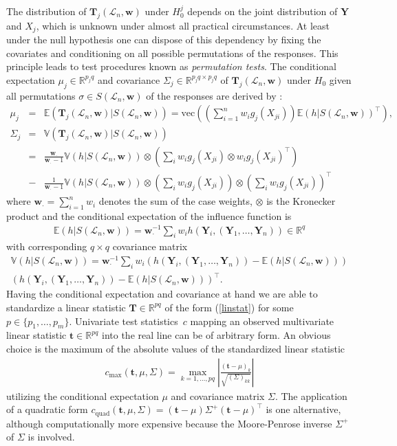\documentclass{Z}
\renewcommand{\E}{\mathbb{E}}
\newcommand{\V}{\mathbb{V}}
\newcommand{\R}{\mathbb{R} }
\newcommand{\LS}{\mathcal{L}_n}
\newcommand{\Y}{\mathbf{Y}}
\newcommand{\T}{\mathbf{T}}
\newcommand{\w}{\mathbf{w}}
\newcommand{\ws}{\mathbf{w}_\cdot}
\renewcommand{\vec}{\text{vec}}
\newcommand{\bft}{\mathbf{t}}
\begin{document}
The distribution of $\T_j(\LS, \w)$ under $H_0^j$ depends on the joint
distribution of $\Y$ and $X_j$, which is unknown under almost all practical
circumstances. At least under the null hypothesis one can dispose of this
dependency by fixing the covariates and conditioning on all possible 
permutations of the responses. This principle leads to test procedures known
as \textit{permutation tests}. 
The conditional expectation $\mu_j \in \R^{p_jq}$ and covariance $\Sigma_j
\in \R^{p_jq \times p_jq}$ of $\T_j(\LS, \w)$ under $H_0$ given
all permutations $\sigma \in S(\LS, \w)$ of the responses are derived by
\cite{StrasserWeber1999}: 
\begin{eqnarray}
\mu_j & = & \E(\T_j(\LS, \w) | S(\LS, \w)) = 
\vec \left( \left( \sum_{i = 1}^n w_i g_j(X_{ji}) \right) \E(h | S(\LS,
\w))^\top
\right), \nonumber \\
\Sigma_j & = & \V(\T_j(\LS, \w) | S(\LS, \w)) \nonumber \\
& = & 
    \frac{\ws}{\ws - 1}  \V(h | S(\LS, \w)) \otimes
        \left(\sum_i w_i  g_j(X_{ji}) \otimes w_i  g_j(X_{ji})^\top \right) \label{expectcovar}
\\
& - & \frac{1}{\ws - 1}  \V(h | S(\LS, \w))  \otimes \left(
        \sum_i w_i g_j(X_{ji}) \right)
\otimes \left( \sum_i w_i g_j(X_{ji})\right)^\top 
\nonumber
\end{eqnarray}
where $\ws = \sum_{i = 1}^n w_i$ denotes the sum of the case weights,
$\otimes$ is the Kronecker product and the conditional expectation of the
influence function is 
\begin{eqnarray*}
\E(h | S(\LS, \w)) = \ws^{-1} \sum_i w_i h(\Y_i, (\Y_1, \dots, \Y_n)) \in
\R^q
\end{eqnarray*} 
with corresponding $q \times q$ covariance matrix
\begin{eqnarray*}
\V(h | S(\LS, \w)) = \ws^{-1} \sum_i w_i \left(h(\Y_i, (\Y_1, \dots, \Y_n)) - \E(h | S(\LS, \w))
\right) \\
\left(h(\Y_i, (\Y_1, \dots, \Y_n)) - \E(h | S(\LS, \w))\right)^\top.
\end{eqnarray*}
Having the conditional expectation and covariance at hand we are able to
standardize a linear statistic $\T \in \R^{pq}$ of the form
(\ref{linstat}) for some $p \in \{p_1, \dots, p_m\}$. 
Univariate test statistics~$c$ mapping an observed multivariate 
linear statistic $\bft \in
\R^{pq}$ into the real line can be of arbitrary form.  An obvious choice is
the maximum of the absolute values of the standardized linear statistic
\begin{eqnarray*}
c_\text{max}(\bft, \mu, \Sigma)  = \max_{k = 1, \dots, pq} \left| \frac{(\bft -
\mu)_k}{\sqrt{(\Sigma)_{kk}}} \right|
\end{eqnarray*}
utilizing the conditional expectation $\mu$ and covariance matrix
$\Sigma$. The application of a quadratic form $c_\text{quad}(\bft, \mu, \Sigma)  = 
(\bft - \mu) \Sigma^+ (\bft - \mu)^\top$ is one alternative, although
computationally more expensive because the Moore-Penrose 
inverse $\Sigma^+$ of $\Sigma$ is involved.
\end{document}
